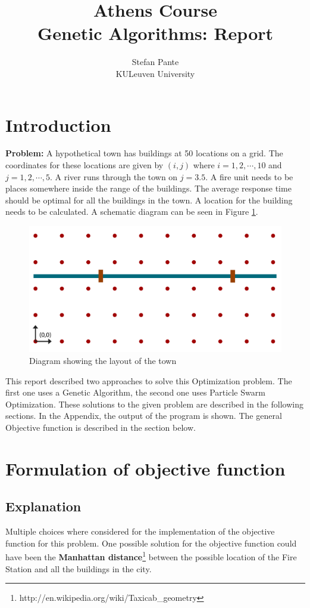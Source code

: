 \documentclass[10pt,a4paper]{article}
\title{Athens Course \\Genetic Algorithms: Report}
\author{Stefan Pante\\ KULeuven University}
\begin{document}
\begin{titlepage}
\maketitle
\tableofcontents
\end{titlepage}
\section{Introduction}
\noindent \textbf{Problem:}
A hypothetical town has buildings at 50 locations on a grid. The coordinates for these locations are given by $(i,j)$ where $i = 1,2,\cdots, 10$ and $j = 1,2, \cdots, 5$. A river runs through the town on $j = 3.5$. A fire unit needs to be places somewhere inside the range of the buildings. The average response time should be optimal for all the buildings in the town. A location for the building needs to be calculated. A schematic diagram can be seen in Figure \ref{fig:diagram}.



\begin{figure}[H]
\centering
\includegraphics[width=0.8\linewidth]{images/diagram.pdf}
\caption{Diagram showing the layout of the town}
\label{fig:diagram}
\end{figure}

\bigskip

\noindent This report described two approaches to solve this Optimization problem. The first one uses a Genetic Algorithm, the second one uses Particle Swarm Optimization. These solutions to the given problem are described in the following sections. In the Appendix, the output of the program is shown. The general Objective function is described in the section below.

\section{Formulation of objective function}
\subsection{Explanation}
\noindent Multiple choices where considered for the implementation of the objective function for this problem. One possible solution for the objective function could have been the \textbf{Manhattan distance}\footnote{http://en.wikipedia.org/wiki/Taxicab\_geometry} between the possible location of the Fire Station and all the buildings in the city. 
\end{document}
